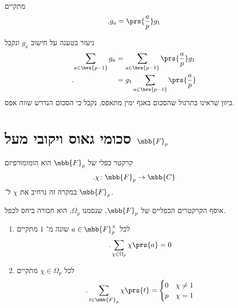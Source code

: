 \documentclass[a4paper,10pt,twoside,openany]{book}
\begin{document}
\begin{proposition}
מתקיים
\begin{align*}
\text{.} g_a = \prs{\frac{a}{p}} g_1
\end{align*}
\end{proposition}

\begin{exercisechap}
ניעזר בטענה על חישוב
$g_a$
ונקבל
\begin{align*}
\sum_{a \in \brs{p-1}} g_a &= \sum_{a \in \brs{p-1}} \prs{\frac{a}{p}} g_1
\\\text{.}\hphantom{\sum_{a \in \brs{p-1}} g_a}&= g_1 \sum_{a \in \brs{p-1}} \prs{\frac{a}{p}}
\end{align*}
כיוון שראינו בתרגול שהסכום באגף ימין מתאפס, נקבל כי הסכום הנדרש שווה אפס.
\end{exercisechap}

\section{סכומי גאוס ויקובי מעל
$\mbb{F}_p$}

\begin{definition}
קרקטר כפלי של
$\mbb{F}_p$
הוא הומומורפיזם
\begin{align*}
\text{.} \chi \colon \mbb{F}_p \to \mbb{C}
\end{align*}
במקרה זה נרחיב את
$\chi$
ל־%
$\mbb{F}_p$.
\end{definition}

\begin{proposition}
אוסף הקרקטרים הכפליים של
$\mbb{F}_p$,
שנסמנו
$\Omega_p$,
הוא חבורה ביחס לכפל.
\end{proposition}

\begin{proposition}
\begin{enumerate}
\item
לכל
$a \in \mbb{F}_p^\times$
שונה מ־%
$1$
מתקיים
\begin{align*}
\text{.} \sum_{\chi \in \Omega_p} \chi\prs{a} = 0
\end{align*}
\item
לכל
$\chi \in \Omega_p$
מתקיים
\begin{align*}
\text{.} \sum_{t \in \mbb{F}_p} \chi\prs{t} = \begin{cases}
0 & \chi \neq 1 \\
p & \chi = 1
\end{cases}
\end{align*}
\end{enumerate}
\end{proposition}
\end{document}
